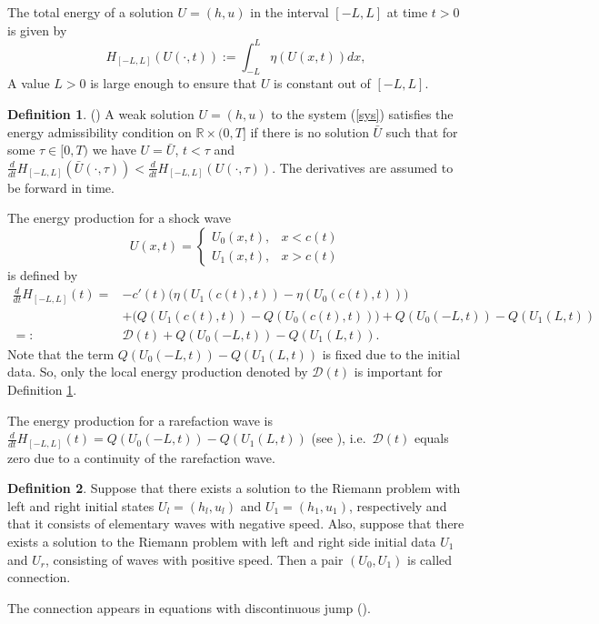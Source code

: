 \documentclass{article}
\theoremstyle{plain}
\theoremstyle{definition}
\newtheorem{definition}{Definition}[section]
\theoremstyle{remark}
\begin{document}
The total energy of a solution $U=(h,u)$ in the interval $[-L,L]$ 
at time $t>0$ is given by 
\[ H_{[-L,L]}(U(\cdot,t)):=\int_{-L}^{L}\eta(U(x,t))dx,\]
A value $L>0$ is large enough to ensure that $U$ is constant
out of $[-L,L]$.

\begin{definition}(\cite{D1973}) \label{d_optim}
A weak solution $U=(h,u)$ to the system (\ref{sys})
satisfies the energy admissibility condition on $\mathbb{R}\times (0,T]$
if there is no solution $\bar{U}$ such that for some $\tau\in [0,T)$ we have
$U=\bar{U}$, $t<\tau$ and $\frac{d}{dt} 
H_{[-L,L]}(\bar{U}(\cdot,\tau))
<\frac{d}{dt}H_{[-L,L]}(U(\cdot,\tau))$. 
The derivatives are assumed to be forward in time.
\end{definition}

The energy production for a shock wave 
\[ 
U(x,t)=\begin{cases}U_{0}(x,t), & x<c(t) \\
U_{1}(x,t), & x>c(t)
\end{cases}
\]
is defined by
\[
\begin{split}
\frac{d}{dt}H_{[-L,L]}(t) = & -c'(t)
\big( \eta(U_{1}(c(t),t)) - \eta(U_{0}(c(t),t))\big) \\
& +\big( Q(U_{1}(c(t),t)) - Q(U_{0}(c(t),t)) \big) 
+Q(U_{0}(-L,t)) - Q(U_{1}(L,t)) \\
=: & \mathcal{D}(t)+Q(U_{0}(-L,t)) - Q(U_{1}(L,t)). 
\end{split}
\]
Note that the term $Q(U_{0}(-L,t)) - Q(U_{1}(L,t))$ is fixed due to
the initial data. So, only the local energy production 
denoted by $\mathcal{D}(t)$ 
is important for Definition \ref{d_optim}. 

The energy production for a rarefaction wave is 
$\frac{d}{dt}H_{[-L,L]}(t)=Q(U_{0}(-L,t)) - Q(U_{1}(L,t))$
(see \cite{D2012}), i.e.\ $\mathcal{D}(t)$ equals zero due to a continuity 
of the rarefaction wave.



\begin{definition}
Suppose that there exists a solution to the Riemann problem
with left and right initial states $U_l=(h_l,u_l)$ and $U_1=(h_1,u_1)$,
respectively and that it consists of elementary waves with negative speed.
Also, suppose that there exists a solution to the Riemann problem with
left and right side initial data $U_1$ and $U_r$, 
consisting of waves with positive speed. Then a  pair $(U_0,U_1)$ 
is called connection.
\end{definition}
The connection appears in equations with discontinuous jump (\cite{BK2008}).
\end{document}
